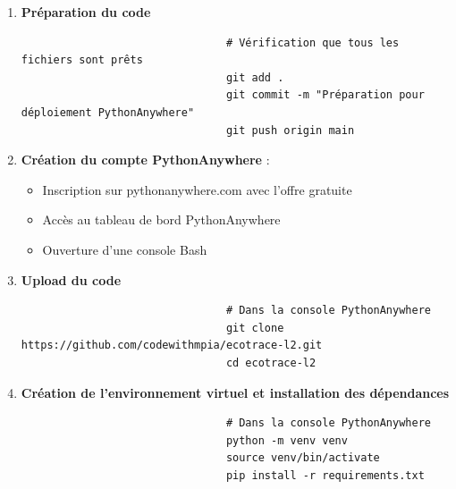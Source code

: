 \documentclass[a4paper,11pt]{article}
\begin{document}
                \begin{enumerate}
                    \item \textbf{Préparation du code}
                        \begin{tcolorbox}[colback=lightgray!6, colframe=black, left=-50mm, right=5mm, top=2mm, bottom=0mm, boxrule=0.1mm]
                            \begin{verbatim}
                                # Vérification que tous les fichiers sont prêts
                                git add .
                                git commit -m "Préparation pour déploiement PythonAnywhere"
                                git push origin main
                            \end{verbatim}
                        \end{tcolorbox}

                    \item \textbf{Création du compte PythonAnywhere} :
                        \begin{itemize}
                            \item Inscription sur pythonanywhere.com avec l'offre gratuite
                            \item Accès au tableau de bord PythonAnywhere
                            \item Ouverture d'une console Bash
                        \end{itemize}

                    \item \textbf{Upload du code}
                        \begin{tcolorbox}[colback=lightgray!6, colframe=black, left=-50mm, right=5mm, top=2mm, bottom=0mm, boxrule=0.1mm]
                            \begin{verbatim}
                                # Dans la console PythonAnywhere
                                git clone https://github.com/codewithmpia/ecotrace-l2.git
                                cd ecotrace-l2
                            \end{verbatim}
                        \end{tcolorbox}

                    \item \textbf{Création de l'environnement virtuel et installation des dépendances}
                        \begin{tcolorbox}[colback=lightgray!6, colframe=black, left=-50mm, right=5mm, top=2mm, bottom=0mm, boxrule=0.1mm]
                            \begin{verbatim}
                                # Dans la console PythonAnywhere
                                python -m venv venv
                                source venv/bin/activate
                                pip install -r requirements.txt
                            \end{verbatim}
                        \end{tcolorbox}


\end{enumerate}
\end{document}
